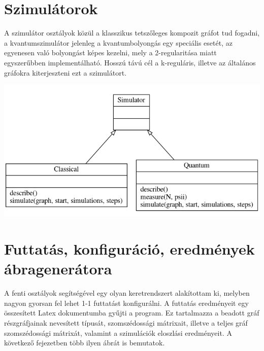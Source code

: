 \section{Szimulátorok}

A szimulátor osztályok közül a klasszikus tetszőleges kompozit gráfot tud
fogadni, a kvantumszimulátor jelenleg a kvantumbolyongás egy speciális
esetét, az egyenesen való bolyongást képes kezelni, mely a 2-regularitása miatt
egyszerűbben implementálható. Hosszú távú cél a k-reguláris, illetve az
általános gráfokra kiterjeszteni ezt a szimulátort.

\begin{center}
  \includegraphics[width=0.8\linewidth]{./figures/simulator.png}
\end{center}

\section{Futtatás, konfiguráció, eredmények ábragenerátora}

A fenti osztályok segítségével egy olyan keretrendszert alakítottam ki, melyben
nagyon gyorsan fel lehet 1-1 futtatást konfigurálni. A futtatás eredményeit egy
összesített Latex dokumentumba gyűjti a program. Ez tartalmazza a beadott gráf
részgráfjainak nevesített típusát, szomszédossági mátrixait, illetve a teljes
gráf szomszédossági mátrixát, valamint a szimulációk eloszlási eredményeit. A
következő fejezetben több ilyen ábrát is bemutatok.
